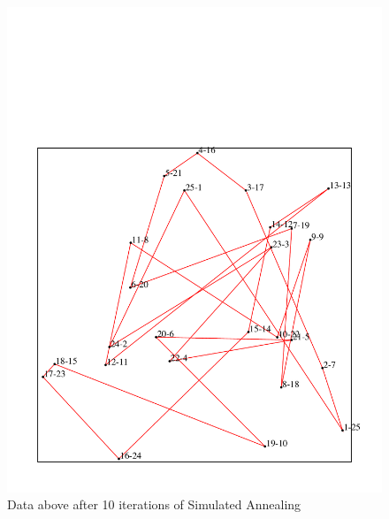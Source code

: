 \begin{figure}[htbp]
  \centering
  \includegraphics[width=1.0\textwidth]{./media/my_samples_partial_sa.pdf}
  \caption{ \label{Figure_1} Data above after 10 iterations of Simulated Annealing}
\end{figure}


